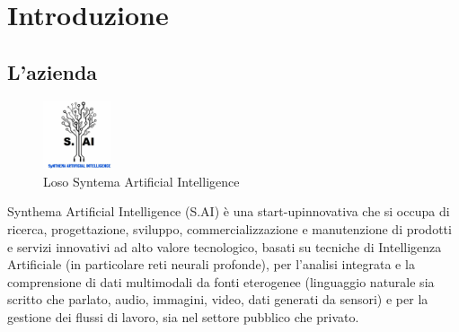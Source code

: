 

\chapter{Introduzione}
\label{cap:introduzione}




\section{L'azienda}
\begin{figure}[H]
  \centering
  \includegraphics[width=2cm]{immagini/logo-SAI.jpg}
  \caption{Loso Syntema Artificial Intelligence}
\end{figure}
Synthema Artificial Intelligence (S.AI) è una \gls{start-up}\glsfirstoccur innovativa che si occupa di ricerca, progettazione, sviluppo, commercializzazione e manutenzione di
prodotti e servizi innovativi ad alto valore tecnologico, basati su tecniche di Intelligenza Artificiale
(in particolare reti neurali profonde), per l'analisi integrata e la comprensione di dati multimodali da fonti eterogenee (linguaggio naturale sia scritto che
parlato, audio, immagini, video, dati generati da sensori) e per la gestione dei flussi di lavoro, sia nel settore pubblico che privato.

